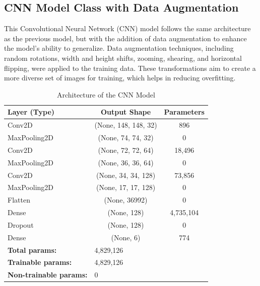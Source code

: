 \subsection{CNN Model Class with Data Augmentation}

This Convolutional Neural Network (CNN) model follows the same architecture as the previous model, but with the addition of data augmentation to enhance the model's ability to generalize. Data augmentation techniques, including random rotations, width and height shifts, zooming, shearing, and horizontal flipping, were applied to the training data. These transformations aim to create a more diverse set of images for training, which helps in reducing overfitting.
\begin{table}[H]
\centering
\caption{Architecture of the CNN Model}
\begin{tabular}{|l|c|c|}
\hline
\textbf{Layer (Type)}          & \textbf{Output Shape} & \textbf{Parameters} \\ \hline
Conv2D                         & (None, 148, 148, 32)  & 896                 \\ \hline
MaxPooling2D                   & (None, 74, 74, 32)    & 0                   \\ \hline
Conv2D                         & (None, 72, 72, 64)    & 18,496              \\ \hline
MaxPooling2D                   & (None, 36, 36, 64)    & 0                   \\ \hline
Conv2D                         & (None, 34, 34, 128)   & 73,856              \\ \hline
MaxPooling2D                   & (None, 17, 17, 128)   & 0                   \\ \hline
Flatten                        & (None, 36992)         & 0                   \\ \hline
Dense                          & (None, 128)           & 4,735,104           \\ \hline
Dropout                        & (None, 128)           & 0                   \\ \hline
Dense                          & (None, 6)           & 774           \\ \hline
\hline
\textbf{Total params:}        & \multicolumn{2}{l|}{4,829,126}              \\ \hline
\textbf{Trainable params:}    & \multicolumn{2}{l|}{4,829,126}              \\ \hline
\textbf{Non-trainable params:} & \multicolumn{2}{l|}{0}                      \\ \hline
\end{tabular}
\label{tab:cnn_architecture}
\end{table}

